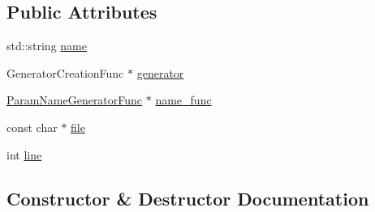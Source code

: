 \subsection*{Public Attributes}
\begin{DoxyCompactItemize}
\item 
std\+::string \mbox{\hyperlink{structtesting_1_1internal_1_1_parameterized_test_suite_info_1_1_instantiation_info_a7e66a4d302537389c8c8efcc9acbe826}{name}}
\item 
Generator\+Creation\+Func $\ast$ \mbox{\hyperlink{structtesting_1_1internal_1_1_parameterized_test_suite_info_1_1_instantiation_info_a567721febd97b2d60ffeedc7fd650ebf}{generator}}
\item 
\mbox{\hyperlink{classtesting_1_1internal_1_1_parameterized_test_suite_info_a3b4f232b7d6d3df941bb8e81b6b534a4}{Param\+Name\+Generator\+Func}} $\ast$ \mbox{\hyperlink{structtesting_1_1internal_1_1_parameterized_test_suite_info_1_1_instantiation_info_a1217ae4145895436933b539716315203}{name\+\_\+func}}
\item 
const char $\ast$ \mbox{\hyperlink{structtesting_1_1internal_1_1_parameterized_test_suite_info_1_1_instantiation_info_ae38ea7cbde34927ddd172a67d7fae19b}{file}}
\item 
int \mbox{\hyperlink{structtesting_1_1internal_1_1_parameterized_test_suite_info_1_1_instantiation_info_a95d4b9adfe5d42f66cc12214f434fa0d}{line}}
\end{DoxyCompactItemize}


\subsection{Constructor \& Destructor Documentation}
\mbox{\label{structtesting_1_1internal_1_1_parameterized_test_suite_info_1_1_instantiation_info_a1cde67cef70758ca16047040747e19c0}} 
